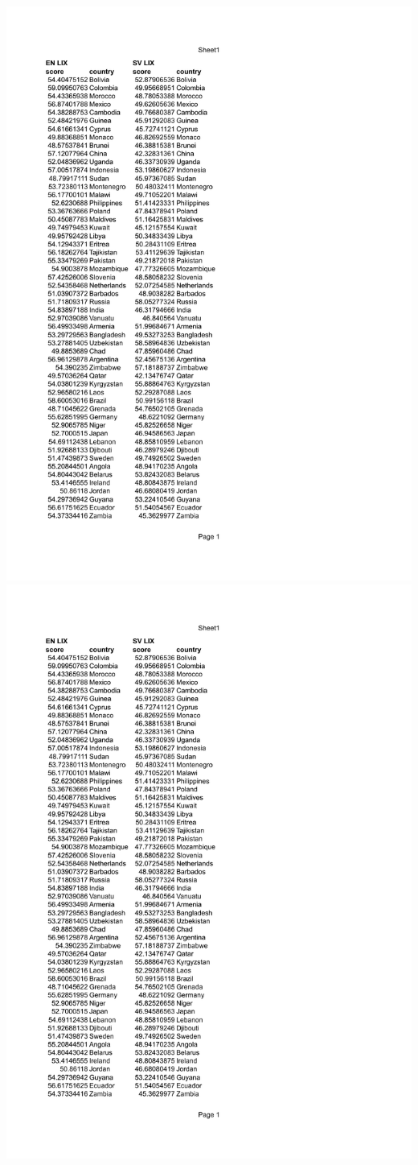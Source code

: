 \documentclass[a4paper]{article}
\begin{document}
\includegraphics[page=2,scale=0.75]{LIX.pdf}
\includegraphics[page=3,scale=0.75]{LIX.pdf}
\end{document}
